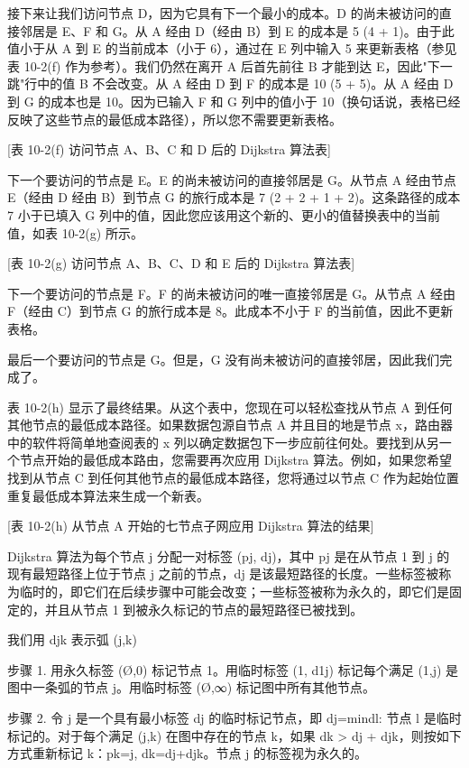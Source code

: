 \documentclass[oneside,UTF8]{ctexart}
\numberwithin{figure}{section} %
\begin{document}
接下来让我们访问节点 D，因为它具有下一个最小的成本。D 的尚未被访问的直接邻居是 E、F 和 G。从 A 经由 D（经由 B）到 E 的成本是 5 (4 + 1)。由于此值小于从 A 到 E 的当前成本（小于 6），通过在 E 列中输入 5 来更新表格（参见表 10-2(f) 作为参考）。我们仍然在离开 A 后首先前往 B 才能到达 E，因此"下一跳"行中的值 B 不会改变。从 A 经由 D 到 F 的成本是 10 (5 + 5)。从 A 经由 D 到 G 的成本也是 10。因为已输入 F 和 G 列中的值小于 10（换句话说，表格已经反映了这些节点的最低成本路径），所以您不需要更新表格。

[表 10-2(f) 访问节点 A、B、C 和 D 后的 Dijkstra 算法表]

下一个要访问的节点是 E。E 的尚未被访问的直接邻居是 G。从节点 A 经由节点 E（经由 D 经由 B）到节点 G 的旅行成本是 7 (2 + 2 + 1 + 2)。这条路径的成本 7 小于已填入 G 列中的值，因此您应该用这个新的、更小的值替换表中的当前值，如表 10-2(g) 所示。

[表 10-2(g) 访问节点 A、B、C、D 和 E 后的 Dijkstra 算法表]

下一个要访问的节点是 F。F 的尚未被访问的唯一直接邻居是 G。从节点 A 经由 F（经由 C）到节点 G 的旅行成本是 8。此成本不小于 F 的当前值，因此不更新表格。

最后一个要访问的节点是 G。但是，G 没有尚未被访问的直接邻居，因此我们完成了。

表 10-2(h) 显示了最终结果。从这个表中，您现在可以轻松查找从节点 A 到任何其他节点的最低成本路径。如果数据包源自节点 A 并且目的地是节点 x，路由器中的软件将简单地查阅表的 x 列以确定数据包下一步应前往何处。要找到从另一个节点开始的最低成本路由，您需要再次应用 Dijkstra 算法。例如，如果您希望找到从节点 C 到任何其他节点的最低成本路径，您将通过以节点 C 作为起始位置重复最低成本算法来生成一个新表。

[表 10-2(h) 从节点 A 开始的七节点子网应用 Dijkstra 算法的结果]

Dijkstra 算法为每个节点 j 分配一对标签 (pj, dj)，其中 pj 是在从节点 1 到 j 的现有最短路径上位于节点 j 之前的节点，dj 是该最短路径的长度。一些标签被称为临时的，即它们在后续步骤中可能会改变；一些标签被称为永久的，即它们是固定的，并且从节点 1 到被永久标记的节点的最短路径已被找到。

我们用 djk 表示弧 (j,k) 

步骤 1. 用永久标签 (Ø,0) 标记节点 1。用临时标签 (1, d1j) 标记每个满足 (1,j) 是图中一条弧的节点 j。用临时标签 (Ø,∞) 标记图中所有其他节点。

步骤 2. 令 j 是一个具有最小标签 dj 的临时标记节点，即 dj=min{dl: 节点 l 是临时标记的}。对于每个满足 (j,k) 在图中存在的节点 k，如果 dk > dj + djk，则按如下方式重新标记 k：pk=j, dk=dj+djk。节点 j 的标签视为永久的。
\end{document}

